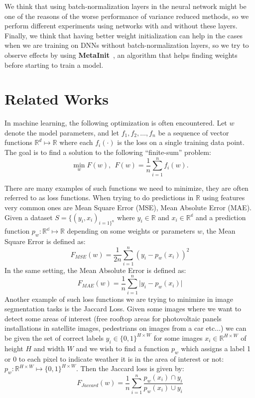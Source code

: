 \documentclass[a4paper,11pt,oneside]{report}
\begin{document}
We think that using batch-normalization layers in the neural network might be one of the reasons of the worse performance of variance reduced methods, so we perform different experiments using networks with and without these layers. Finally, we think that having better weight initialization can help in the cases when we are training on DNNs without batch-normalization layers, so we try to observe effects by using \textbf{MetaInit}~\cite{NEURIPS2019_876e8108}, an algorithm that helps finding weights before starting to train a model.


\chapter{Related Works}

In machine learning, the following optimization is often encountered.
Let $w$ denote the model parameters, and let $f_1, f_2, \dots, f_n$ be a sequence of vector functions $\mathbb{R}^d \mapsto \mathbb{R}$ where each $f_i(\cdot)$ is the loss on a single training data point.
The goal is to find a solution to the following ``finite-sum'' problem:
\begin{equation}\label{eq:minimzing_function}
    \min_w F(w),~~F(w)=\frac{1}{n}\sum_{i=1}^n f_i(w).
\end{equation}

There are many examples of such functions we need to minimize, they are often referred to as loss functions. When trying to do predictions in $\mathbb{R}$ using features very common ones are Mean Square Error (MSE), Mean Absolute Error (MAE). Given a dataset $S=\{(y_i, x_i)_{i=1\}^n}$ where $y_i \in \mathbb{R}$ and $x_i \in \mathbb{R^d}$ and a prediction function $p_w : \mathbb{R^d} \mapsto \mathbb{R}$ depending on some weights or parameters $w$, the Mean Square Error is defined as:
$$F_{MSE}(w) = \frac{1}{2n}\sum_{i=1}^n(y_i - p_w(x_i))^2$$
In the same setting, the Mean Absolute Error is defined as:
$$F_{MAE}(w) = \frac{1}{n}\sum_{i=1}^n\mathopen|y_i - p_w(x_i)\mathclose|$$
Another example of such loss functions we are trying to minimize in image segmentation tasks is the Jaccard Loss. Given some images where we want to detect some areas of interest (free rooftop areas for photovoltaic panels installations in satellite images, pedestrians on images from a car etc$\dots$) we can be given the set of correct labels $y_i \in \{0,1\}^{H \times W}$ for some images $x_i \in \mathbb{R}^{H \times W}$ of height $H$ and width $W$ and we wish to find a function $p_w$ which assigns a label 1 or 0 to each pixel to indicate weather it is in the area of interest or not: $p_w : \mathbb{R}^{H \times W} \mapsto \{0,1\}^{H \times W}$. Then the Jaccard loss is given by:
$$F_{Jaccard}(w) = \frac{1}{n}\sum_{i=1}^n \frac{p_w(x_i) \cap y_i}{p_w(x_i) \cup y_i}$$
\end{document}
